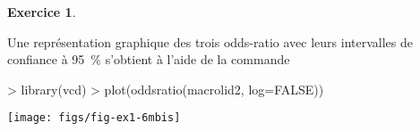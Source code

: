 \documentclass[11pt]{report}
\makeatletter
\theoremstyle{definition}
\newtheorem{exo}{Exercice}[chapter]
\newcommand{\foo}[1]{\texttt{#1}}
\newcommand{\cmd}[1]{\index{#1@\foo{#1}}}
\makeatother
\begin{document}
\begin{exo}
\begin{sol}
Une représentation graphique des trois odds-ratio avec leurs intervalles de
confiance à 95~\% s'obtient à l'aide de la commande 
\begin{Schunk}
\begin{Sinput}
> library(vcd)
> plot(oddsratio(macrolid2, log=FALSE))
\end{Sinput}
\end{Schunk}
\texttt{[image: figs/fig-ex1-6mbis]}
\end{sol}
\end{exo}
%
%
\end{document}
